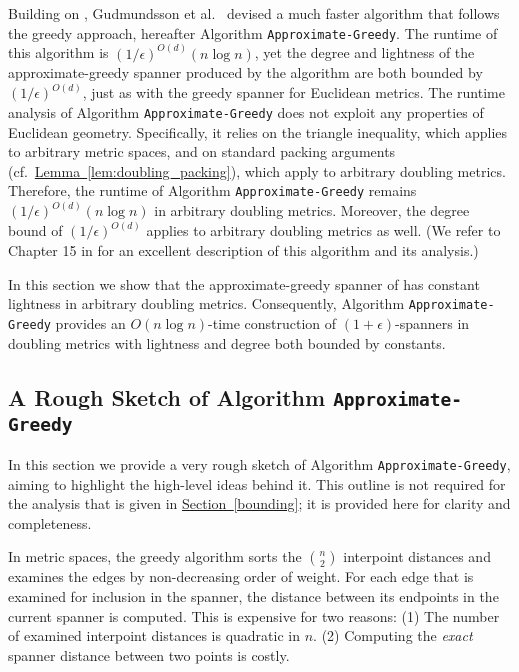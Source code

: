 \documentclass[11pt,letterpaper]{article}
\newcommand{\eps}{\epsilon}
\newcommand{\namedref}[2]{\hyperref[#2]{#1~\ref*{#2}}}
\newcommand{\sectionref}[1]{\namedref{Section}{#1}}
\newcommand{\lemmaref}[1]{\namedref{Lemma}{#1}}
\begin{document}
\sloppy Building on \cite{DHN93,DN97}, Gudmundsson et al.\ \cite{GLN02} devised a much faster algorithm that follows the greedy approach,
hereafter Algorithm \texttt{Approximate-Greedy}.
The runtime of this algorithm is $(1/\eps)^{O(d)}(n \log n)$, yet the degree and lightness of the approximate-greedy spanner produced by the algorithm are both bounded by $(1/\eps)^{O(d)}$, just as with the greedy spanner for Euclidean metrics.
The runtime analysis of Algorithm \texttt{Approximate-Greedy} \cite{GLN02} does not exploit any properties of Euclidean geometry.
Specifically, it relies on the triangle inequality, which applies to arbitrary metric spaces, and on standard packing arguments (cf.\ \lemmaref{lem:doubling_packing}), which apply to arbitrary doubling metrics.
Therefore, the runtime of Algorithm \texttt{Approximate-Greedy} remains $(1/\eps)^{O(d)}(n \log n)$ in arbitrary doubling metrics.
Moreover, the degree bound of  $(1/\eps)^{O(d)}$ applies to arbitrary doubling metrics as well.
(We refer to Chapter 15 in \cite{NS07} for an excellent description of this algorithm and its analysis.)

In this section we show that the approximate-greedy spanner of \cite{GLN02} has constant lightness in arbitrary doubling metrics.
Consequently, Algorithm  \texttt{Approximate-Greedy} provides an $O(n\log n)$-time construction of $(1+\eps)$-spanners in doubling metrics with lightness and degree both bounded by constants.

\subsection{A Rough Sketch of Algorithm \texttt{Approximate-Greedy}}
In this section we provide a  very rough sketch of Algorithm \texttt{Approximate-Greedy}, aiming to highlight the high-level ideas behind it.
This outline is not required for the analysis that is given in \sectionref{bounding}; it is provided here for clarity and completeness.

In metric spaces, the greedy algorithm sorts the ${n \choose 2}$ interpoint distances and examines the edges by non-decreasing order of weight.
For each edge that is examined for inclusion in the spanner, the distance between its endpoints in the current spanner is computed.
This is expensive for two reasons: (1) The number of examined interpoint distances is quadratic in $n$.
(2) Computing the \emph{exact} spanner distance between two points is   costly.
\end{document}
